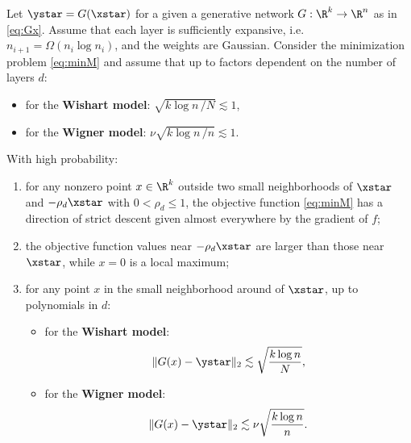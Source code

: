 \begin{thm}[Informal]\label{thm:informal}
	Let $\ystar = G(\xstar)$ for a given a generative network $G: \R^k \to \R^n$ as in \eqref{eq:Gx}.
	Assume that each layer is sufficiently expansive, i.e.  $n_{i+1} = \Omega(n_i \log n_i)$, and the weights are Gaussian. Consider the minimization problem  \eqref{eq:minM} and assume 
	that up to factors dependent on the number of layers $d$:
	\begin{itemize}
		\item  for the \textbf{Wishart model}:
		$\sqrt{k \log n \, /N} \lesssim 1 $,
		\item for the \textbf{Wigner model}: 
		$\nu \sqrt{k \log n \, /n} \lesssim 1$.
	\end{itemize}
	With high probability:
	\begin{enumerate}[label=\Alph*.]
		\item for any nonzero point $x \in \R^k$ outside two small neighborhoods of $\xstar$ and $- \rho_d \xstar$ with $0 < \rho_d  \leq 1$, the objective function \eqref{eq:minM} has a direction of strict descent given almost everywhere by the gradient of $f$;
		
		\item the objective function values near
		$-\rho_d \xstar$ are larger than those near $\xstar$, while $x = 0$ is a local maximum;
		
		\item for any point $x$ in the small neighborhood around of $\xstar$, up to polynomials in $d$:
		\begin{itemize}
			\item for the \textbf{Wishart model}:	
			\begin{equation}\label{eq:ws_scaling}
			\| G(x) - \ystar\|_2	\lesssim \sqrt{\frac{k \log n }{N}},
			\end{equation}
			\item  for the \textbf{Wigner model}: 
			\begin{equation}\label{eq:wg_scaling}
			\| G(x) - \ystar\|_2	\lesssim \nu \sqrt{\frac{k \log n}{n}}.
			\end{equation}
		\end{itemize}
	\end{enumerate}
\end{thm}

